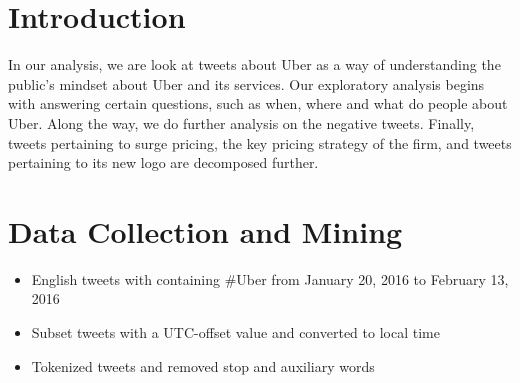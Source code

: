 \documentclass[a222,landscape]{a0poster}
\begin{document}
\begin{multicols}{4} %


\color{Navy} %

\color{DarkRed} %

\section*{Introduction}
In our analysis, we are look at tweets about Uber as a way of understanding the public’s mindset about Uber and its services. Our exploratory analysis begins with answering certain questions, such as when, where and what do people about Uber. Along the way, we do further analysis on the negative tweets. Finally, tweets pertaining to surge pricing, the key pricing strategy of the firm, and tweets pertaining to its new logo are decomposed further.


\color{DarkSlateGray} %

\section*{Data Collection and Mining}

\begin{itemize}
   \item English tweets with containing \#Uber from January 20, 2016 to February 13, 2016
   \item Subset tweets with a UTC-offset value and converted to local time
   \item Tokenized tweets and removed stop and auxiliary words
\end{itemize}






\end{multicols}
\end{document}
